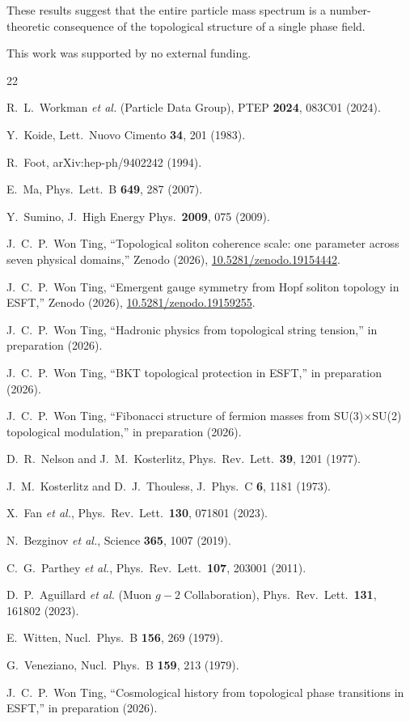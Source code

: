 ﻿\documentclass[twocolumn,preprintnumbers,amsmath,amssymb]{revtex4-2}
\begin{document}
These results suggest that the entire particle mass spectrum is a number-theoretic consequence of the topological structure of a single phase field.

\begin{acknowledgments}
This work was supported by no external funding. \end{acknowledgments}

\begin{thebibliography}{22}

 R.~L.~Workman \textit{et al.} (Particle Data Group), PTEP \textbf{2024}, 083C01 (2024).

 Y.~Koide, Lett.\ Nuovo Cimento \textbf{34}, 201 (1983).

 R.~Foot, arXiv:hep-ph/9402242 (1994).

 E.~Ma, Phys.\ Lett.\ B \textbf{649}, 287 (2007).

 Y.~Sumino, J.\ High Energy Phys.\ \textbf{2009}, 075 (2009).

 J.~C.~P.~Won Ting, ``Topological soliton coherence scale: one parameter across seven physical domains,'' Zenodo (2026), \href{https://doi.org/10.5281/zenodo.19154442}{10.5281/zenodo.19154442}.

 J.~C.~P.~Won Ting, ``Emergent gauge symmetry from Hopf soliton topology in ESFT,'' Zenodo (2026), \href{https://doi.org/10.5281/zenodo.19159255}{10.5281/zenodo.19159255}.

 J.~C.~P.~Won Ting, ``Hadronic physics from topological string tension,'' in preparation (2026).

 J.~C.~P.~Won Ting, ``BKT topological protection in ESFT,'' in preparation (2026).

 J.~C.~P.~Won Ting, ``Fibonacci structure of fermion masses from SU(3)$\times$SU(2) topological modulation,'' in preparation (2026).

 D.~R.~Nelson and J.~M.~Kosterlitz, Phys.\ Rev.\ Lett.\ \textbf{39}, 1201 (1977).

 J.~M.~Kosterlitz and D.~J.~Thouless, J.\ Phys.\ C \textbf{6}, 1181 (1973).

 X.~Fan \textit{et al.}, Phys.\ Rev.\ Lett.\ \textbf{130}, 071801 (2023).

 N.~Bezginov \textit{et al.}, Science \textbf{365}, 1007 (2019).

 C.~G.~Parthey \textit{et al.}, Phys.\ Rev.\ Lett.\ \textbf{107}, 203001 (2011).

 D.~P.~Aguillard \textit{et al.} (Muon $g{-}2$ Collaboration), Phys.\ Rev.\ Lett.\ \textbf{131}, 161802 (2023).

 E.~Witten, Nucl.\ Phys.\ B \textbf{156}, 269 (1979).

 G.~Veneziano, Nucl.\ Phys.\ B \textbf{159}, 213 (1979).

 J.~C.~P.~Won Ting, ``Cosmological history from topological phase transitions in ESFT,'' in preparation (2026).

\end{thebibliography}
\end{document}
